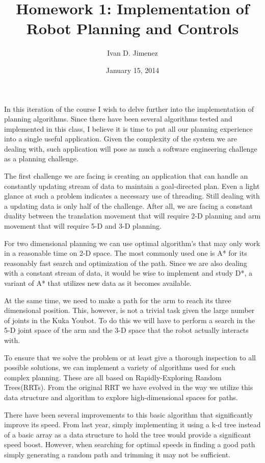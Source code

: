 \documentclass[twocolumn]{article}
\begin{document}
\title{Homework 1: Implementation of Robot Planning and Controls}
\author{Ivan D. Jimenez}
\date{January 15, 2014}
\maketitle

In this iteration of the course I wish to delve further into the implementation of planning algorithms. Since there have been several algorithms tested and implemented in this class, I believe it is time to put all our planning experience into a single useful application. Given the complexity of the system we are dealing with, such application will pose as much a software engineering challenge as a planning challenge.

The first challenge we are facing is creating an application that can handle an constantly updating stream of data to maintain a goal-directed plan. Even a light glance at such a problem indicates a necessary use of threading. Still dealing with a updating data is only half of the challenge. After all, we are facing a constant duality between the translation movement that will require 2-D planning and arm movement that will require 5-D and 3-D planning.

For two dimensional planning we can use optimal algorithm's that may only work in a reasonable time on 2-D space. The most commonly used one is A* for its reasonably fast search and optimization of the path. Since we are also dealing with a constant stream of data, it would be wise to implement and study D*, a variant of A* that utilizes new data as it becomes available. 

At the same time, we need to make a path for the arm to reach its three dimensional position. This, however, is not a trivial task given the large number of joints in the Kuka Youbot. To do this we will have to perform a search in the 5-D joint space of the arm and the 3-D space that the robot actually interacts with. 

To ensure that we solve the problem or at least give a thorough inspection to all possible solutions, we can implement a variety of algorithms used for such complex planning. These are all based on Rapidly-Exploring Random Trees(RRTs). From the original RRT we have evolved in the way we utilize this data structure and algorithm to explore high-dimensional spaces for paths.

There have been several improvements to this basic algorithm that significantly improve its speed. From last year, simply implementing it using a k-d tree instead of a basic array as a data structure to hold the tree would provide a significant speed boost. However, when searching for optimal speeds in finding a good path simply generating a random path and trimming it may not be sufficient. 
\end{document}
